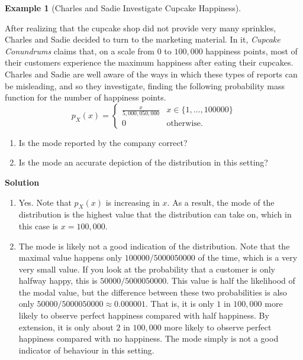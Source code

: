\documentclass[
  letterpaper,
  DIV=11,
  numbers=noendperiod]{scrreprt}
\providecommand{\tightlist}{%
  \setlength{\itemsep}{0pt}\setlength{\parskip}{0pt}}\usepackage{longtable,booktabs,array}
\theoremstyle{definition}
\theoremstyle{definition}
\newtheorem{example}{Example}[chapter]
\theoremstyle{definition}
\theoremstyle{remark}
\begin{document}
\begin{example}[Charles and Sadie Investigate Cupcake
Happiness]\protect\hypertarget{exm-triangular-distributions}{}\label{exm-triangular-distributions}

After realizing that the cupcake shop did not provide very many
sprinkles, Charles and Sadie decided to turn to the marketing material.
In it, \emph{Cupcake Conundrums} claims that, on a scale from \(0\) to
\(100,000\) happiness points, most of their customers experience the
maximum happiness after eating their cupcakes. Charles and Sadie are
well aware of the ways in which these types of reports can be
misleading, and so they investigate, finding the following probability
mass function for the number of happiness points.
\[p_X(x) = \begin{cases}
    \frac{x}{5,000,050,000} & x \in \{1,\dots,100 000\} \\
    0 & \text{otherwise}.
\end{cases}\]

\begin{enumerate}
\def\labelenumi{\alph{enumi}.}
\tightlist
\item
  Is the mode reported by the company correct?
\item
  Is the mode an accurate depiction of the distribution in this setting?
\end{enumerate}

\begin{tcolorbox}[enhanced jigsaw, colback=white, colframe=quarto-callout-color-frame, arc=.35mm, leftrule=.75mm, rightrule=.15mm, opacityback=0, breakable, bottomrule=.15mm, left=2mm, toprule=.15mm]

\vspace{-3mm}\textbf{Solution}\vspace{3mm}

\begin{enumerate}
\def\labelenumi{\alph{enumi}.}
\item
  Yes. Note that \(p_X(x)\) is increasing in \(x\). As a result, the
  mode of the distribution is the highest value that the distribution
  can take on, which in this case is \(x = 100,000\).
\item
  The mode is likely not a good indication of the distribution. Note
  that the maximal value happens only \(100000/5000050000\) of the time,
  which is a very very small value. If you look at the probability that
  a customer is only halfway happy, this is \(50000/5000050000\). This
  value is half the likelihood of the modal value, but the difference
  between these two probabilities is also only
  \(50000/5000050000 \approx 0.000001\). That is, it is only \(1\) in
  \(100,000\) more likely to observe perfect happiness compared with
  half happiness. By extension, it is only about \(2\) in \(100,000\)
  more likely to observe perfect happiness compared with no happiness.
  The mode simply is not a good indicator of behaviour in this setting.
\end{enumerate}

\end{tcolorbox}

\end{example}
\end{document}
